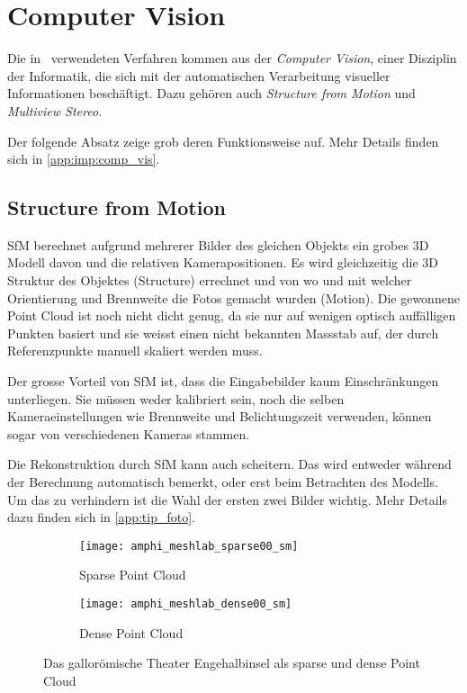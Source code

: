 	\section{Computer Vision}
		Die in \dronarch\ verwendeten Verfahren kommen aus der \emph{Computer Vision}, einer Disziplin der Informatik, die sich mit der automatischen Verarbeitung visueller Informationen beschäftigt. Dazu gehören auch \emph{Structure from Motion} und \emph{Multiview Stereo}.

		Der folgende Absatz zeige grob deren Funktionsweise auf. Mehr Details finden sich in \autoref{app:imp:comp_vis}.
		
		\subsection{Structure from Motion} \label{sfm}
			SfM berechnet aufgrund mehrerer Bilder des gleichen Objekts ein grobes 3D Modell davon und die relativen Kamerapositionen. Es wird gleichzeitig die 3D Struktur des Objektes (Structure) errechnet und von wo und mit welcher Orientierung und Brennweite die Fotos gemacht wurden (Motion).
			Die gewonnene Point Cloud ist noch nicht dicht genug, da sie nur auf wenigen optisch auffälligen Punkten basiert und sie weisst einen nicht bekannten Massstab auf, der durch Referenzpunkte manuell skaliert werden muss.
			
			Der grosse Vorteil von SfM ist, dass die Eingabebilder kaum Einschränkungen unterliegen. Sie müssen weder kalibriert sein, noch die selben Kameraeinstellungen wie Brennweite und Belichtungszeit verwenden, können sogar von verschiedenen Kameras stammen.
			
			Die Rekonstruktion durch SfM kann auch scheitern. Das wird entweder während der Berechnung automatisch bemerkt, oder erst beim Betrachten des Modells. Um das zu verhindern ist die Wahl der ersten zwei Bilder wichtig. Mehr Details dazu finden sich in \autoref{app:tip_foto}.
			\begin{figure}
				\begin{subfigure}{0.5\textwidth}
					\texttt{[image: amphi\_meshlab\_sparse00\_sm]}
					\caption{Sparse Point Cloud}
					\label{amphi_sparse}
				\end{subfigure}
				\begin{subfigure}{0.5\textwidth}
					\texttt{[image: amphi\_meshlab\_dense00\_sm]}
					\caption{Dense Point Cloud}
					\label{amphi_dense}
				\end{subfigure}
				\caption{Das gallorömische Theater Engehalbinsel als sparse und dense Point Cloud}
				\label{amphi_pointclouds}
			\end{figure}			
